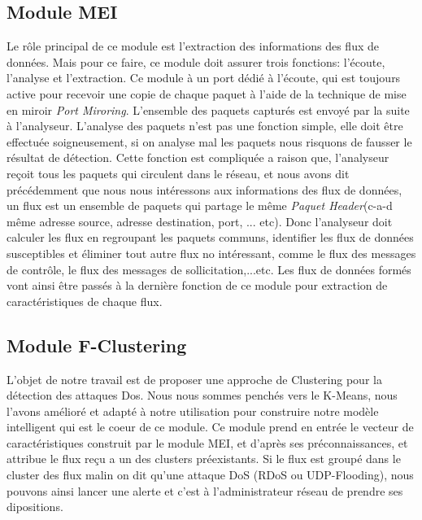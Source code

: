 \newpage
\subsection{Module MEI}
Le rôle principal de ce module est l'extraction des informations des flux de données. Mais pour ce faire, ce module doit assurer trois fonctions: l'écoute, l'analyse et l'extraction. Ce module à un port dédié à l'écoute, qui est toujours active pour recevoir une copie de chaque paquet à l'aide de la technique de mise en miroir \textit{Port Miroring}. L'ensemble des paquets capturés est envoyé par la suite à l'analyseur. L'analyse des paquets n'est pas une fonction simple, elle doit être effectuée soigneusement, si on analyse mal les paquets nous risquons de fausser le résultat de détection. Cette fonction est compliquée a raison que, l'analyseur reçoit tous les paquets qui circulent dans le réseau, et nous avons dit précédemment que nous nous intéressons aux informations des flux de données, un flux est un ensemble de paquets qui partage le même \textit{Paquet Header}(c-a-d même adresse source, adresse destination, port, ... etc). Donc l'analyseur doit calculer les flux en regroupant les paquets communs, identifier les flux de données susceptibles et éliminer tout autre flux no intéressant, comme le flux des messages de contrôle, le flux des messages de sollicitation,...etc. Les flux de données formés vont ainsi être passés à la dernière fonction de ce module pour extraction de caractéristiques de chaque flux.

\newpage
\subsection{Module F-Clustering}
L'objet de notre travail est de proposer une approche de Clustering pour la détection des attaques Dos. Nous nous sommes penchés vers le K-Means, nous l'avons amélioré et adapté à notre utilisation pour construire notre modèle intelligent qui est le coeur de ce module. Ce module prend en entrée le vecteur de caractéristiques construit par le module MEI, et d'après ses préconnaissances, et attribue le flux reçu a un des clusters préexistants. Si le flux est groupé dans le cluster des flux malin on dit qu'une attaque DoS (RDoS ou UDP-Flooding), nous pouvons ainsi lancer une alerte et c'est à l'administrateur réseau de prendre ses dipositions.

